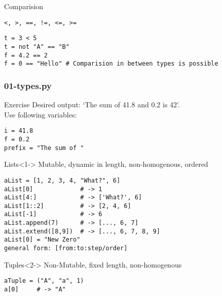 \documentclass{beamer}
\begin{document}
\begin{frame}[fragile]
    \begin{block}{Comparision}
        \begin{verbatim}
<, >, ==, !=, <=, >=
        \end{verbatim}
    \end{block}
    \begin{example}{}
        \begin{verbatim}
t = 3 < 5
t = not "A" == "B"
f = 4.2 == 2
f = 0 == "Hello" # Comparision in between types is possible
        \end{verbatim}
    \end{example}
\end{frame}

\begin{frame}[fragile]
    \frametitle{01-types.py}
    \begin{exampleblock}{Exercise}
    Desired output: `The sum of 41.8 and 0.2 is 42'.\\
    Use following variables:
        \begin{verbatim}
i = 41.8
f = 0.2
prefix = "The sum of "
        \end{verbatim}
    \end{exampleblock}
\end{frame}

\begin{frame}[fragile]
    \begin{block}{Lists}<1->
Mutable, dynamic in length, non-homogenous, ordered
\begin{verbatim}
aList = [1, 2, 3, 4, "What?", 6]
aList[0]             # -> 1
aList[4:]            # -> ['What?', 6]
aList[1::2]          # -> [2, 4, 6]
aList[-1]            # -> 6
aList.append(7)      # -> [..., 6, 7]
aList.extend([8,9])  # -> [..., 6, 7, 8, 9]
aList[0] = "New Zero"
general form: [from:to:step/order]
\end{verbatim}
    \end{block}
    \begin{block}{Tuples}<2->
    Non-Mutable, fixed length, non-homogenous
    \begin{verbatim}
aTuple = ("A", "a", 1)
a[0]     # -> "A"
    \end{verbatim}
\end{block}
\end{frame}
\end{document}

